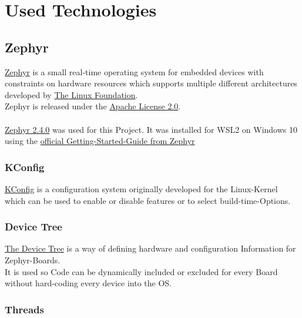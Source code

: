 \pagebreak

\section{Used Technologies}

\subsection{Zephyr}

\href{https://zephyrproject.org/}
{Zephyr} is a small real-time operating system for embedded devices with constraints
on hardware resources which supports multiple different architectures
developed by
\href{https://www.linuxfoundation.org/}
{The Linux Foundation}.\\
Zephyr is released under the
\href{https://www.apache.org/licenses/LICENSE-2.0.html}
{Apache License 2.0}.
\\
\\
\href{https://docs.zephyrproject.org/2.4.0/index.html}
{Zephyr 2.4.0} was used for this Project.
It was installed for WSL2 on Windows 10 using the
\href{https://docs.zephyrproject.org/2.4.0/getting_started/index.html}
{official Getting-Started-Guide from Zephyr}

\subsubsection{KConfig}

\href{https://www.kernel.org/doc/html/latest/kbuild/kconfig-language.html}
{KConfig} is a configuration system originally developed for the Linux-Kernel
which can be used to enable or disable features or to select build-time-Options.

\subsubsection{Device Tree}

\href{https://docs.zephyrproject.org/2.0.0/guides/dts/index.html}
{The Device Tree} is a way of defining hardware and configuration
Information for Zephyr-Boards.
\\
It is used so Code can be dynamically included or excluded for
every Board without hard-coding every device into the OS.

\subsubsection{Threads}

